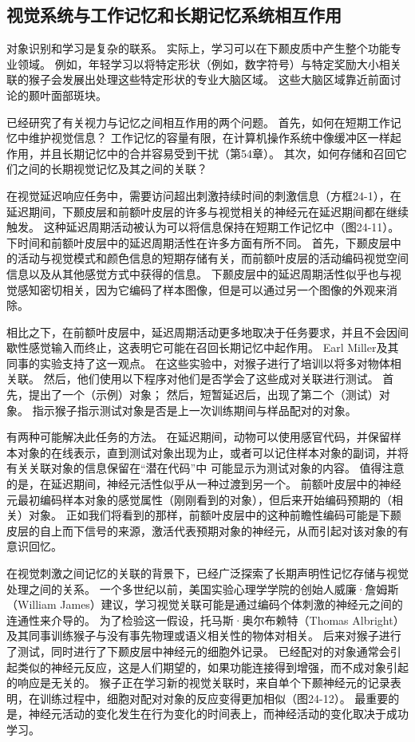 \subsection{视觉系统与工作记忆和长期记忆系统相互作用}
对象识别和学习是复杂的联系。 实际上，学习可以在下颞皮质中产生整个功能专业领域。 例如，年轻学习以将特定形状（例如，数字符号）与特定奖励大小相关联的猴子会发展出处理这些特定形状的专业大脑区域。 这些大脑区域靠近前面讨论的颞叶面部斑块。

已经研究了有关视力与记忆之间相互作用的两个问题。 首先，如何在短期工作记忆中维护视觉信息？ 工作记忆的容量有限，在计算机操作系统中像缓冲区一样起作用，并且长期记忆中的合并容易受到干扰（第54章）。 其次，如何存储和召回它们之间的长期视觉记忆及其之间的关联？

在视觉延迟响应任务中，需要访问超出刺激持续时间的刺激信息（方框24-1），在延迟期间，下颞皮层和前额叶皮层的许多与视觉相关的神经元在延迟期间都在继续触发。 这种延迟周期活动被认为可以将信息保持在短期工作记忆中（图24-11）。 下时间和前额叶皮层中的延迟周期活性在许多方面有所不同。 首先，下颞皮层中的活动与视觉模式和颜色信息的短期存储有关，而前额叶皮层的活动编码视觉空间信息以及从其他感觉方式中获得的信息。 下颞皮层中的延迟周期活性似乎也与视觉感知密切相关，因为它编码了样本图像，但是可以通过另一个图像的外观来消除。

相比之下，在前额叶皮层中，延迟周期活动更多地取决于任务要求，并且不会因间歇性感觉输入而终止，这表明它可能在召回长期记忆中起作用。 Earl Miller及其同事的实验支持了这一观点。 在这些实验中，对猴子进行了培训以将多对物体相关联。 然后，他们使用以下程序对他们是否学会了这些成对关联进行测试。 首先，提出了一个（示例）对象； 然后，短暂延迟后，出现了第二个（测试）对象。 指示猴子指示测试对象是否是上一次训练期间与样品配对的对象。

有两种可能解决此任务的方法。 在延迟期间，动物可以使用感官代码，并保留样本对象的在线表示，直到测试对象出现为止，或者可以记住样本对象的副词，并将有关关联对象的信息保留在“潜在代码”中 可能显示为测试对象的内容。 值得注意的是，在延迟期间，神经元活性似乎从一种过渡到另一个。 前额叶皮层中的神经元最初编码样本对象的感觉属性（刚刚看到的对象），但后来开始编码预期的（相关）对象。 正如我们将看到的那样，前额叶皮层中的这种前瞻性编码可能是下颞皮层的自上而下信号的来源，激活代表预期对象的神经元，从而引起对该对象的有意识回忆。

在视觉刺激之间记忆的关联的背景下，已经广泛探索了长期声明性记忆存储与视觉处理之间的关系。 一个多世纪以前，美国实验心理学学院的创始人威廉·詹姆斯（William James）建议，学习视觉关联可能是通过编码个体刺激的神经元之间的连通性来介导的。 为了检验这一假设，托马斯·奥尔布赖特（Thomas Albright）及其同事训练猴子与没有事先物理或语义相关性的物体对相关。 后来对猴子进行了测试，同时进行了下颞皮层中神经元的细胞外记录。 已经配对的对象通常会引起类似的神经元反应，这是人们期望的，如果功能连接得到增强，而不成对象引起的响应是无关的。 猴子正在学习新的视觉关联时，来自单个下颞神经元的记录表明，在训练过程中，细胞对配对对象的反应变得更加相似（图24-12）。 最重要的是，神经元活动的变化发生在行为变化的时间表上，而神经活动的变化取决于成功学习。

